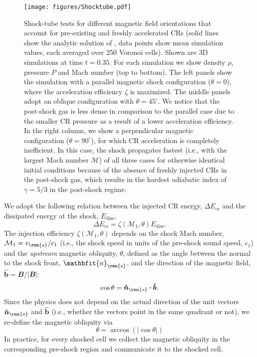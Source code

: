 \documentclass[8pt,a4paper,usenatbib]{mnras}
\newcommand{\bcdot}{\ensuremath{%
  \mathchoice%
   {\mskip\thinmuskip\lower0.2ex\hbox{\scalebox{1.5}{$\cdot$}}\mskip\thinmuskip}}%
   {\mskip\thinmuskip\lower0.2ex\hbox{\scalebox{1.5}{$\cdot$}}\mskip\thinmuskip}%
   {\lower0.3ex\hbox{\scalebox{1.2}{$\cdot$}}}%
   {\lower0.3ex\hbox{\scalebox{1.2}{$\cdot$}}}%
}
\newcommand{\mach}{\mathcal{M}}
\newcommand{\vecbf}{\mathbfit}
\begin{document}
\begin{figure*}
\centering
\texttt{[image: figures/Shocktube.pdf]} 
\caption{Shock-tube tests for different magnetic field orientations that account
  for pre-existing and freshly accelerated CRs (solid lines show the analytic
  solution of \citet{2017MNRAS.465.4500P}, data points show mean simulation
  values, each averaged over 250 Voronoi cells). Shown are 3D simulations at
  time $t=0.35$. For each simulation we show density $\rho$, pressure $P$ and
  Mach number (top to bottom). The left panels show the simulation with a
  parallel magnetic shock configuration ($\theta=0$), where the acceleration
  efficiency $\zeta$ is maximized. The middle panels adopt an oblique
  configuration with $\theta=45^\circ$. We notice that the post-shock gas is
  less dense in comparison to the parallel case due to the smaller CR pressure
  as a result of a lower acceleration efficiency. In the right column, we show a
  perpendicular magnetic configuration ($\theta=90^\circ$), for which CR
  acceleration is completely inefficient. In this case, the shock propagates
  fastest (i.e., with the largest Mach number $\mach$) of all three cases for
  otherwise identical initial conditions because of the absence of freshly
  injected CRs in the post-shock gas, which results in the hardest adiabatic
  index of $\gamma=5/3$ in the post-shock regime.}
\label{fig2:Shocktubes}
\end{figure*}

We adopt the following relation between the injected CR energy, $\Delta
E_{\mathrm{cr}}$ and the dissipated energy at the shock, $E_{\mathrm{diss}}$,
\begin{equation}
\label{deltaE}
\Delta E_{\mathrm{cr}} = \zeta(\mach_1, \theta) E_{\mathrm{diss}}.
\end{equation}
The injection efficiency $\zeta(\mach_1, \theta)$ depends on the shock Mach
number, $\mach_1=v_\rmn{s}/c_1$ (i.e., the shock speed in units of the pre-shock
sound speed, $c_1$) and the {\it upstream} magnetic obliquity, $\theta$, defined
as the angle between the normal to the shock front, $\vecbf{n}_\rmn{s}$, and the
direction of the magnetic field, $\bm{\hat{b}}=\vecbf{B}/|\vecbf{B}|$:
\begin{equation}
\cos\theta =  \bm{\hat{n}}_\rmn{s} \bcdot \bm{\hat{b}}.
\end{equation}
Since the physics does not depend on the actual direction of the unit vectors
$\bm{\hat{n}}_\rmn{s}$ and $\bm{\hat{b}}$ (i.e., whether the vectors point in the same
quadrant or not), we re-define the magnetic obliquity via
\begin{equation}
  \theta = \arccos(|\cos\theta|)
\end{equation}
In practice, for every shocked cell we collect the magnetic obliquity in the
corresponding pre-shock region and communicate it to the shocked cell.
\end{document}
